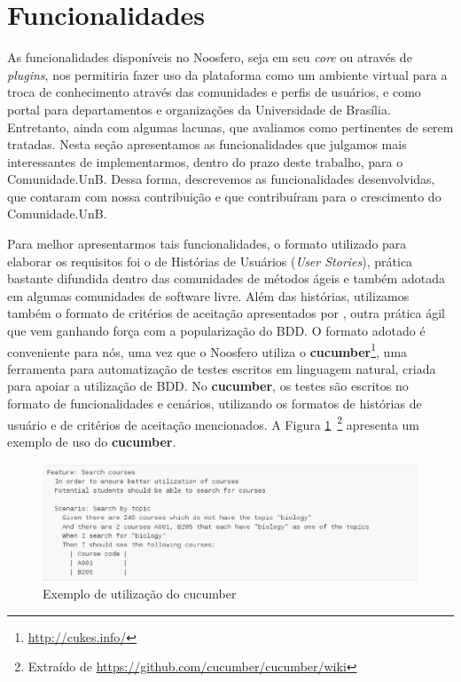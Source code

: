 \section{Funcionalidades}
\label{funcionalidades}



As funcionalidades disponíveis no Noosfero, seja em seu \textit{core}
ou através de \textit{plugins}, nos permitiria fazer uso da plataforma como
um ambiente virtual para a troca de conhecimento através das comunidades e
perfis de usuários, e como portal para departamentos e organizações da
Universidade de Brasília. Entretanto, ainda com algumas lacunas, que avaliamos
como pertinentes de serem tratadas.
%
Nesta seção apresentamos as funcionalidades que julgamos mais interessantes
de implementarmos, dentro do prazo deste trabalho, para o Comunidade.UnB.
%
Dessa forma, descrevemos as funcionalidades desenvolvidas, que contaram com
nossa contribuição e que contribuíram para o crescimento do Comunidade.UnB.


Para melhor apresentarmos tais funcionalidades, o formato utilizado para
elaborar os requisitos foi o de Histórias de Usuários (\textit{User Stories}),
prática bastante difundida dentro das comunidades de métodos ágeis e também
adotada em algumas comunidades de software livre. 
%
Além das histórias, utilizamos também o formato de critérios de aceitação
apresentados por , outra
prática ágil que vem ganhando força com a popularização do BDD.
%
O formato adotado é conveniente para nós, uma vez que o Noosfero utiliza o
\textbf{cucumber}\footnote{\url{http://cukes.info/}}, uma ferramenta para
automatização de testes escritos em linguagem natural, criada para apoiar a
utilização de BDD. No \textbf{cucumber}, os testes são escritos no formato
de funcionalidades e cenários, utilizando os formatos de histórias de
usuário e de critérios de aceitação mencionados. A Figura
\ref{cucumber}~\footnote{Extraído de \url{https://github.com/cucumber/cucumber/wiki}}
apresenta um exemplo de uso do \textbf{cucumber}.

\begin{figure}[h]
	\centering
	\includegraphics[keepaspectratio=true,scale=0.6]{figuras/cucumber_sample.eps}
	\caption{Exemplo de utilização do cucumber}
	\label{cucumber}
\end{figure}

